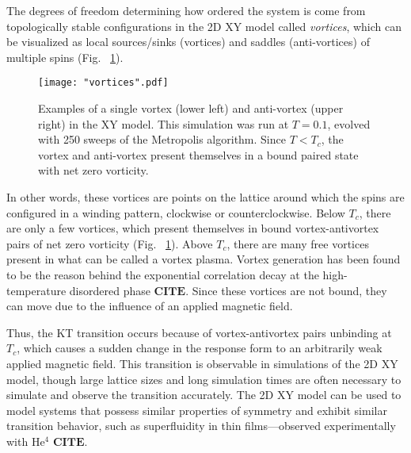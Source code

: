 \documentclass[twocolumn,aps]{revtex4-1} %
\begin{document}
The degrees of freedom determining how ordered the system is come from topologically stable configurations in the 2D XY model called \textit{vortices}, which can be visualized as local sources/sinks (vortices) and saddles (anti-vortices) of multiple spins (Fig.~ \ref{fig:vortices}).
\begin{figure}
	\texttt{[image: "vortices".pdf]}
	\caption{\label{fig:vortices} Examples of a single vortex (lower left) and anti-vortex (upper right) in the XY model. This simulation was run at $T = 0.1$, evolved with 250 sweeps of the Metropolis algorithm. Since $T < T_c$, the vortex and anti-vortex present themselves in a bound paired state with net zero vorticity.}
\end{figure}
In other words, these vortices are points on the lattice around which the spins are configured in a winding pattern, clockwise or counterclockwise. Below $T_c$, there are only a few vortices, which present themselves in bound vortex-antivortex pairs of net zero vorticity (Fig.~ \ref{fig:vortices}). Above $T_c$, there are many free vortices present in what can be called a vortex plasma. Vortex generation has been found to be the reason behind the exponential correlation decay at the high-temperature disordered phase $\textbf{CITE}$. Since these vortices are not bound, they can move due to the influence of an applied magnetic field. 

Thus, the KT transition occurs because of vortex-antivortex pairs unbinding at $T_c$, which causes a sudden change in the response form to an arbitrarily weak applied magnetic field. This transition is observable in simulations of the 2D XY model, though large lattice sizes and long simulation times are often necessary to simulate and observe the transition accurately. The 2D XY model can be used to model systems that possess similar properties of symmetry and exhibit similar transition behavior, such as superfluidity in thin films---observed experimentally with He$^4$ $\textbf{CITE}$.
\end{document}
